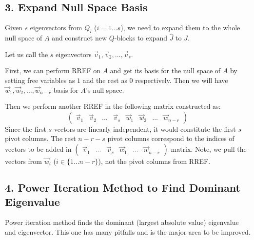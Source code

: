 \documentclass[12pt, a4paper]{article}
\begin{document}
\subsection*{\color{accent} 3. Expand Null Space Basis}
Given $s$ eigenvectors from $Q_i$ ($i = 1 \dots s$), we need to expand them to the whole null space of $A$ and construct new $Q$-blocks to expand $\hat{J}$ to $J$.

Let us call the $s$ eigenvectors $\vec{v}_1, \vec{v}_2, \dots, \vec{v}_s$.

First, we can perform RREF on $A$ and get its basis for the null space of $A$ by setting free variables as $1$ and the rest as $0$ respectively. Then we will have $\vec{w}_1, \vec{w}_2, \dots, \vec{w}_{n-r}$ basis for $A$'s null space.

Then we perform another RREF in the following matrix constructed as:
\[
\begin{pmatrix} \vec{v}_1 & \vec{v}_2 & \dots & \vec{v}_s & \vec{w}_1 & \vec{w}_2 & \dots & \vec{w}_{n-r} \end{pmatrix}
\]
Since the first $s$ vectors are linearly independent, it would constitute the first $s$ pivot columns. The rest $n - r - s$ pivot columns correspond to the indices of vectors to be added in $\begin{pmatrix} \vec{v}_1 & \dots & \vec{v}_s & \vec{w}_1 & \dots & \vec{w}_{n-r} \end{pmatrix}$ matrix. Note, we pull the vectors from $\vec{w}_i$ ($i \in \{1 \dots n-r\}$), not the pivot columns from RREF.

\subsection*{\color{accent} 4. Power Iteration Method to Find Dominant Eigenvalue}
Power iteration method finds the dominant (largest absolute value) eigenvalue and eigenvector. This one has many pitfalls and is the major area to be improved.
\end{document}
